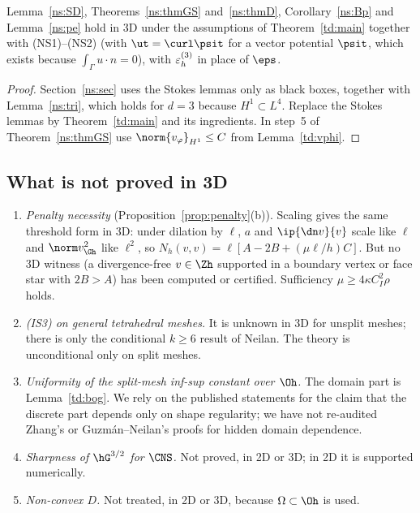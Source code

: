 \begin{corollary}\label{td:ns}
Lemma~\ref{ns:SD}, Theorems~\ref{ns:thmGS} and~\ref{ns:thmD}, Corollary~\ref{ns:Bp} and Lemma~\ref{ns:pe} hold in 3D under the assumptions of Theorem~\ref{td:main} together with (NS1)--(NS2) (with $\ut=\curl\psit$ for a vector potential $\psit$, which exists because $\int_\Gamma u\cdot n=0$), with $\varepsilon_h^{(3)}$ in place of $\eps$.
\end{corollary}

\begin{proof}
Section~\ref{ns:sec} uses the Stokes lemmas only as black boxes, together with Lemma~\ref{ns:tri}, which holds for $d=3$ because $H^1\subset L^4$. Replace the Stokes lemmas by Theorem~\ref{td:main} and its ingredients. In step~5 of Theorem~\ref{ns:thmGS} use $\norm{v_\varphi}_{H^1}\le C$ from Lemma~\ref{td:vphi}.
\end{proof}

\subsection{What is not proved in 3D}\label{td:open}
\begin{enumerate}
\item \emph{Penalty necessity} (Proposition~\ref{prop:penalty}(b)). Scaling gives the same threshold form in 3D: under dilation by $\ell$, $a$ and $\ip{\dn v}{v}$ scale like $\ell$ and $\norm v^2_{\Gh}$ like $\ell^2$, so $N_h(v,v)=\ell[A-2B+(\mu\ell/h)C]$. But no 3D witness (a divergence-free $v\in\Zh$ supported in a boundary vertex or face star with $2B>A$) has been computed or certified. Sufficiency $\mu\ge4\kappa C_I^2\rho$ holds.
\item \emph{(IS3) on general tetrahedral meshes.} It is unknown in 3D for unsplit meshes; there is only the conditional $k\ge6$ result of Neilan. The theory is unconditional only on split meshes.
\item \emph{Uniformity of the split-mesh inf-sup constant over $\Oh$.} The domain part is Lemma~\ref{td:bog}. We rely on the published statements for the claim that the discrete part depends only on shape regularity; we have not re-audited Zhang's or Guzm\'an--Neilan's proofs for hidden domain dependence.
\item \emph{Sharpness of $\hG^{3/2}$ for $\CNS$.} Not proved, in 2D or 3D; in 2D it is supported numerically.
\item \emph{Non-convex $D$.} Not treated, in 2D or 3D, because $\Omega\subset\Oh$ is used.
\end{enumerate}
